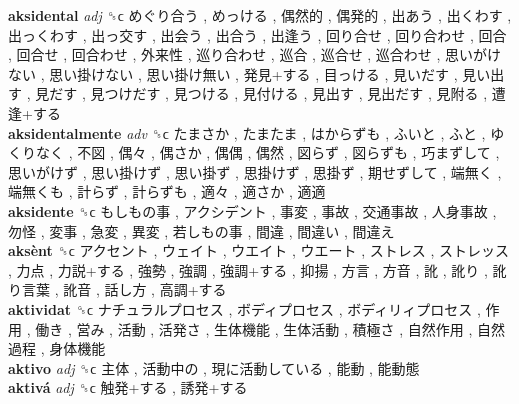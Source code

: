 \textbf{aksidental} \emph{adj}  ␝ϲ   めぐり合う ,  めっける ,  偶然的 ,  偶発的 ,  出あう ,  出くわす ,  出っくわす ,  出っ交す ,  出会う ,  出合う ,  出逢う ,  回り合せ ,  回り合わせ ,  回合 ,  回合せ ,  回合わせ ,  外来性 ,  巡り合わせ ,  巡合 ,  巡合せ ,  巡合わせ ,  思いがけない ,  思い掛けない ,  思い掛け無い ,  発見+する ,  目っける ,  見いだす ,  見い出す ,  見だす ,  見つけだす ,  見つける ,  見付ける ,  見出す ,  見出だす ,  見附る ,  遭逢+する   \\
\textbf{aksidentalmente} \emph{adv}  ␝ϲ   たまさか ,  たまたま ,  はからずも ,  ふいと ,  ふと ,  ゆくりなく ,  不図 ,  偶々 ,  偶さか ,  偶偶 ,  偶然 ,  図らず ,  図らずも ,  巧まずして ,  思いがけず ,  思い掛けず ,  思い掛ず ,  思掛けず ,  思掛ず ,  期せずして ,  端無く ,  端無くも ,  計らず ,  計らずも ,  適々 ,  適さか ,  適適   \\
\textbf{aksidente} ␝ϲ   もしもの事 ,  アクシデント ,  事変 ,  事故 ,  交通事故 ,  人身事故 ,  勿怪 ,  変事 ,  急変 ,  異変 ,  若しもの事 ,  間違 ,  間違い ,  間違え   \\
\textbf{aksènt} ␝ϲ   アクセント ,  ウェイト ,  ウエイト ,  ウエート ,  ストレス ,  ストレッス ,  力点 ,  力説+する ,  強勢 ,  強調 ,  強調+する ,  抑揚 ,  方言 ,  方音 ,  訛 ,  訛り ,  訛り言葉 ,  訛音 ,  話し方 ,  高調+する   \\
\textbf{aktividat} ␝ϲ   ナチュラルプロセス ,  ボディプロセス ,  ボディリィプロセス ,  作用 ,  働き ,  営み ,  活動 ,  活発さ ,  生体機能 ,  生体活動 ,  積極さ ,  自然作用 ,  自然過程 ,  身体機能   \\
\textbf{aktivo} \emph{adj}  ␝ϲ   主体 ,  活動中の ,  現に活動している ,  能動 ,  能動態   \\
\textbf{aktivá} \emph{adj}  ␝ϲ   触発+する ,  誘発+する   \\
